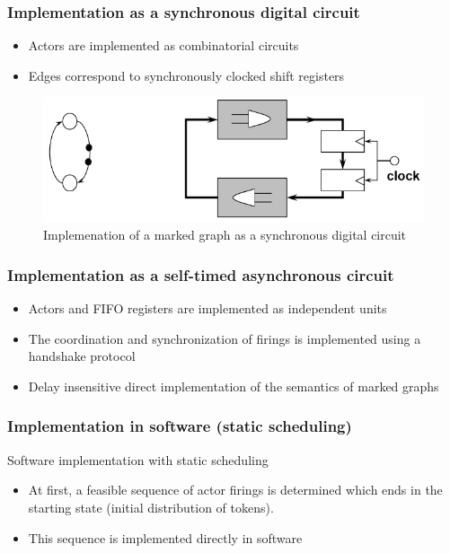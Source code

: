 \subsubsection{Implementation as a synchronous digital circuit}
\begin{itemize}[noitemsep]
\item Actors are implemented as combinatorial circuits
\item Edges correspond to synchronously clocked shift registers
\end{itemize}

\begin{figure}[ht]
	\centering
  	\includegraphics[scale=0.5]{img/10_implementation_hardware.png}
	\caption{Implemenation of a marked graph as a synchronous digital circuit}
	\label{fig_implementation_hw}
\end{figure}

\subsubsection{Implementation as a self-timed asynchronous 
circuit}
\begin{itemize}[noitemsep]
\item Actors and FIFO registers are implemented as independent units
\item The coordination and synchronization of firings is implemented using a handshake protocol
\item Delay insensitive direct implementation of the semantics of marked graphs
\end{itemize}

\subsubsection{Implementation in software (static scheduling)}
Software implementation with static scheduling

\begin{itemize}[noitemsep]
\item At first, a feasible sequence of actor firings is determined which ends in the starting state (initial distribution of tokens). 
\item This sequence is implemented directly in software
\end{itemize}

